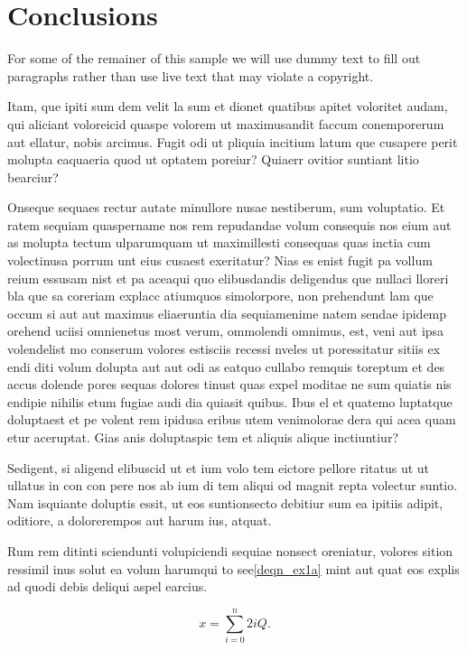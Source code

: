 \documentclass[lettersize,journal]{IEEEtran}
\begin{document}
\section{Conclusions}
\label{sec:conclusions}
For some of the remainer of this sample we will use dummy text to fill out paragraphs rather than use live text that may violate a copyright.

Itam, que ipiti sum dem velit la sum et dionet quatibus apitet voloritet audam, qui aliciant voloreicid quaspe volorem ut maximusandit faccum conemporerum aut ellatur, nobis arcimus.
Fugit odi ut pliquia incitium latum que cusapere perit molupta eaquaeria quod ut optatem poreiur? Quiaerr ovitior suntiant litio bearciur?

Onseque sequaes rectur autate minullore nusae nestiberum, sum voluptatio. Et ratem sequiam quaspername nos rem repudandae volum consequis nos eium aut as molupta tectum ulparumquam ut maximillesti consequas quas inctia cum volectinusa porrum unt eius cusaest exeritatur? Nias es enist fugit pa vollum reium essusam nist et pa aceaqui quo elibusdandis deligendus que nullaci lloreri bla que sa coreriam explacc atiumquos simolorpore, non prehendunt lam que occum\cite{ref6} si aut aut maximus eliaeruntia dia sequiamenime natem sendae ipidemp orehend uciisi omnienetus most verum, ommolendi omnimus, est, veni aut ipsa volendelist mo conserum volores estisciis recessi nveles ut poressitatur sitiis ex endi diti volum dolupta aut aut odi as eatquo cullabo remquis toreptum et des accus dolende pores sequas dolores tinust quas expel moditae ne sum quiatis nis endipie nihilis etum fugiae audi dia quiasit quibus.
\IEEEpubidadjcol
Ibus el et quatemo luptatque doluptaest et pe volent rem ipidusa eribus utem venimolorae dera qui acea quam etur aceruptat.
Gias anis doluptaspic tem et aliquis alique inctiuntiur?

Sedigent, si aligend elibuscid ut et ium volo tem eictore pellore ritatus ut ut ullatus in con con pere nos ab ium di tem aliqui od magnit repta volectur suntio. Nam isquiante doluptis essit, ut eos suntionsecto debitiur sum ea ipitiis adipit, oditiore, a dolorerempos aut harum ius, atquat.

Rum rem ditinti sciendunti volupiciendi sequiae nonsect oreniatur, volores sition ressimil inus solut ea volum harumqui to see\eqref{deqn_ex1a} mint aut quat eos explis ad quodi debis deliqui aspel earcius.

\begin{equation}
\label{deqn_ex1a}
x = \sum_{i=0}^{n} 2{i} Q.
\end{equation}
\end{document}
